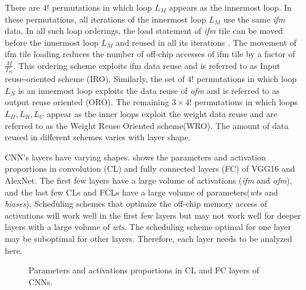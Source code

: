 There are $4!$ permutations in which loop $L_M$ appears as the innermost loop. In these permutations, all iterations of the innermost loop $L_M$ use the same \textit{ifm} data. In all such loop orderings, the load statement of \textit{ifm} tile can be moved before the innermost loop $L_M$ and reused in all its iterations \cite{zhang2015optimizing}. The movement of ifm tile loading reduces the number of off-chip accesses of ifm tile by a factor of $\frac{M}{T_m}$. This ordering scheme exploits ifm data reuse and is referred to as Input reuse-oriented scheme (IRO). Similarly, the set of $4!$ permutations in which loop $L_N$ is an innermost loop exploits the data reuse of \textit{ofm} and is referred to as output reuse oriented (ORO). The remaining $3\times 4!$ permutations in which loops $L_D, L_R, L_C$ appear as the inner loops exploit the weight data reuse and are referred to as the Weight Reuse Oriented scheme(WRO). The amount of data reused in different schemes varies with layer shape.

CNN's layers have varying shapes.  shows the parameters and activation proportions in convolution (CL) and fully connected layers (FC) of VGG16 and AlexNet. The first few layers have a large volume of activations (\textit{ifm} and \textit{ofm}), and the last few CLs and FCLs have a large volume of parameters(\textit{wts} and \textit{biases}). Scheduling schemes that optimize the off-chip memory access of activations will work well in the first few layers but may not work well for deeper layers with a large volume of \textit{wts}. The scheduling scheme optimal for one layer may be suboptimal for other layers. Therefore, each layer needs to be analyzed here.
\begin{figure}[!htb]
	\centering
	\captionsetup{font=sf}	
	\hfil	
	\hfil	
	\caption{Parameters and activations proportions in CL and FC layers of CNNs.}
	\label{fig:ParamsNactProp}
\end{figure}
